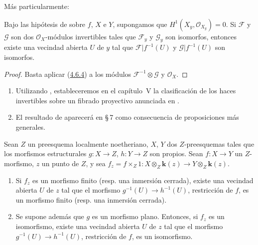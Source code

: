 Más particularmente:

\begin{corollary}[4.6.5]
\label{III.4.6.5}
\label{III.4.6.5-fr}
Bajo las hipótesis de  sobre $f$, $X$ e $Y$,
supongamos que
$H^1(X_y,\mathcal O_{X_y})=0$.
Si $\mathcal F$ y $\mathcal G$ son dos $\mathcal O_X$-módulos invertibles tales
que $\mathcal F_y$ y $\mathcal G_y$ son isomorfos, entonces existe una vecindad
abierta $U$ de $y$
tal que $\mathcal F|f^{-1}(U)$ y $\mathcal G|f^{-1}(U)$ son isomorfos.
\end{corollary}

\begin{proof}
Basta aplicar (\hyperref[III.4.6.4-fr]{4.6.4}) a los módulos
$\mathcal F^{-1}\otimes\mathcal G$ y $\mathcal O_X$.
\end{proof}

\begin{remarks}[4.6.6]
\label{III.4.6.6}
\label{III.4.6.6-fr}
\begin{enumerate}
\item[(i)] Utilizando , estableceremos en el capítulo~V
  la clasificación de los haces invertibles sobre un fibrado proyectivo
  anunciada en .
\item[(ii)] El resultado de  aparecerá en \S\,7 como
  consecuencia de proposiciones más generales.
\end{enumerate}
\end{remarks}

\begin{proposition}[4.6.7]
\label{III.4.6.7-fr}
Sean $Z$ un preesquema localmente noetheriano, $X$, $Y$ dos $Z$-preesquemas
tales que los morfismos estructurales $g:X\to Z$, $h:Y\to Z$ son propios.
Sean $f:X\to Y$ un $Z$-morfismo, $z$ un punto de $Z$, y sea
$f_z=f\times_Z1:
X\otimes_Z\boldsymbol{k}(z)\longrightarrow Y\otimes_Z\boldsymbol{k}(z)$.
\begin{enumerate}
\item[\textup{(i)}] Si $f_z$ es un morfismo finito \textup{(resp.} una inmersión cerrada),
existe una vecindad abierta $U$ de $z$ tal que el morfismo
$g^{-1}(U)\to h^{-1}(U)$, restricción de $f$, es un morfismo finito \textup{(resp.}
una inmersión cerrada).
\item[\textup{(ii)}] Se supone además que $g$ es un morfismo plano. Entonces, si
$f_z$ es un isomorfismo, existe una vecindad abierta $U$ de $z$ tal que
el morfismo $g^{-1}(U)\to h^{-1}(U)$, restricción de $f$, es un
isomorfismo.
\end{enumerate}
\end{proposition}


